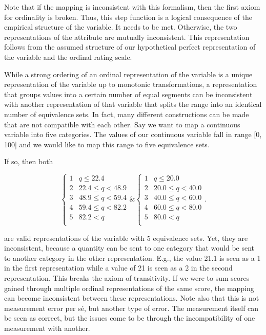 \documentclass[utf8]{FrontiersinVancouver}
\begin{document}
Note that if the mapping is inconsistent with this formalism, then the first axiom for ordinality is broken. Thus, this step function is a logical consequence of the empirical structure of the variable. It needs to be met. Otherwise, the two representations of the attribute are mutually inconsistent. This representation follows from the assumed structure of our hypothetical perfect representation of the variable and the ordinal rating scale. 

While a strong ordering of an ordinal representation of the variable is a unique representation of the variable up to monotonic transformations, a representation that groups values into a certain number of equal segments can be inconsistent with another representation of that variable that splits the range into an identical number of equivalence sets. In fact, many different constructions can be made that are not compatible with each other. Say we want to map a continuous variable into five categories. The values of our continuous variable fall in range [0, 100] and we would like to map this range to five equivalence sets.

If so, then both

\[
\begin{cases} 
    1 & q \leq 22.4\\
    2 & 22.4 \leq q < 48.9\\
    3 & 48.9 \leq q < 59.4\\
    4 & 59.4 \leq q < 82.2\\    
    5 & 82.2 < q\\
\end{cases}
\&
\begin{cases} 
    1 & q \leq 20.0\\
    2 & 20.0 \leq q < 40.0\\
    3 & 40.0 \leq q < 60.0\\
    4 & 60.0 \leq q < 80.0\\    
    5 & 80.0 < q\\
\end{cases}.
\]

are valid representations of the variable with 5 equivalence sets. Yet, they are inconsistent, because a quantity can be sent to one category that would be sent to another category in the other representation. E.g., the value 21.1 is seen as a 1 in the first representation while a value of 21 is seen as a 2 in the second representation. This breaks the axiom of transitivity. If we were to sum scores gained through multiple ordinal representations of the same score, the mapping can become inconsistent between these representations. Note also that this is not measurement error per sé, but another type of error. The measurement itself can be seen as correct, but the issues come to be through the incompatibility of one measurement with another.
\end{document}
